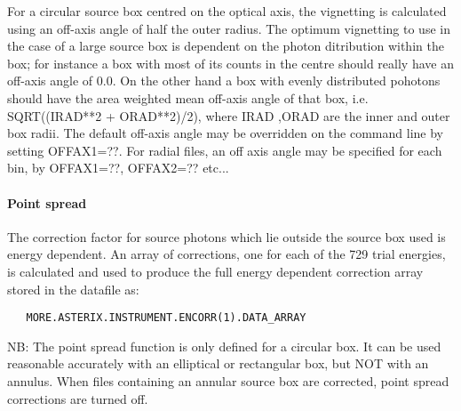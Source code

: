 \documentclass{book}
\renewcommand{\_}{{\tt\char'137}}     %
\begin{document}
For a circular source box centred on the optical axis, the vignetting
is calculated using an off-axis angle of half the outer radius. The
optimum vignetting to use in the case of a large source box is dependent
on the photon ditribution within the box; for instance a box with most
of its counts in the centre should really have an off-axis angle of 0.0.
On the other hand a box with evenly distributed pohotons should have the
area weighted mean off-axis angle of that box,
i.e. SQRT((IRAD**2 + ORAD**2)/2), where IRAD ,ORAD are the inner and outer
box radii. The default off-axis angle may be overridden on the command
line by setting OFFAX1=??. For radial files, an off axis angle may be
specified for each bin, by OFFAX1=??, OFFAX2=?? etc...
 
\paragraph{Point spread}
The correction factor for source photons which lie outside the source
box used is energy dependent. An array of corrections, one for each of
the 729 trial energies, is calculated and used to produce the full
energy dependent correction array stored in the datafile as:
\begin{verbatim}
   MORE.ASTERIX.INSTRUMENT.ENCORR(1).DATA_ARRAY
\end{verbatim}
NB: The point spread function is only defined for a circular box.
It can be used reasonable accurately with an elliptical or rectangular
box, but NOT with an annulus. When files containing an annular source
box are corrected, point spread corrections are turned off.
 
\end{document}
